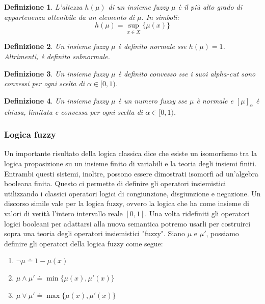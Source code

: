 \documentclass[10pt,a4paper]{article}
\newtheorem{definition}{Definizione}
\begin{document}
\begin{definition}
L'\emph{altezza} $h(\mu)$ di un insieme fuzzy $\mu$ è il più alto grado di appartenenza ottenibile da un elemento di $\mu$. In simboli:
$$
h(\mu) = \sup_{x \in X} \{\mu(x)\}
$$
\end{definition}

\begin{definition}
Un insieme fuzzy $\mu$ è definito \emph{normale} sse $h(\mu) = 1$. Altrimenti, è definito \emph{subnormale}.
\end{definition}

\begin{definition}
Un insieme fuzzy $\mu$ è definito \emph{convesso} sse i suoi alpha-cut sono convessi per ogni scelta di $\alpha \in [0,1)$.
\end{definition}

\begin{definition}
Un insieme fuzzy $\mu$ è un \emph{numero fuzzy} sse $\mu$ è normale e $[\mu]_\alpha$ è chiusa, limitata e convessa per ogni scelta di $\alpha \in [0,1)$.
\end{definition}

\subsubsection{Logica fuzzy}

Un importante risultato della logica classica dice che esiste un isomorfismo tra la logica proposizione su un insieme finito di variabili e la teoria degli insiemi finiti. Entrambi questi sistemi, inoltre, possono essere dimostrati isomorfi ad un'algebra booleana finita. Questo ci permette di definire gli operatori insiemistici utilizzando i classici operatori logici di congiunzione, disgiunzione e negazione. Un discorso simile vale per la logica fuzzy, ovvero la logica che ha come insieme di valori di verità l'intero intervallo reale $[0,1]$. Una volta ridefiniti gli operatori logici booleani per adattarsi alla nuova semantica potremo usarli per costruirci sopra una teoria degli operatori insiemistici "fuzzy". Siano $\mu$ e $\mu'$, possiamo definire gli operatori della logica fuzzy come segue:
\begin{enumerate}
\item{$\neg \mu \doteq 1 - \mu(x)$} 
\item{$\mu \wedge \mu' \doteq \min\{\mu(x),\mu'(x)\}$}
\item{$\mu \vee \mu' \doteq \max\{\mu(x),\mu'(x)\}$}
\end{enumerate}
\end{document}

